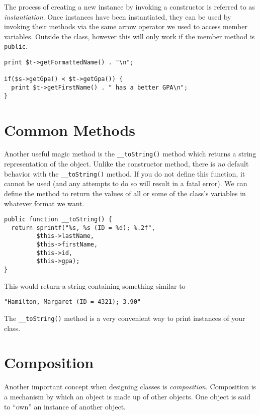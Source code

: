 The process of creating a new instance by invoking a constructor is
referred to as \emph{instantiation}.  Once instances have been instantiated,
they can be used by invoking their methods via the same arrow
operator we used to access member variables.  Outside the class, however
this will only work if the member method is \texttt{public}.

\begin{verbatim}
print $t->getFormattedName() . "\n";

if($s->getGpa() < $t->getGpa()) {
  print $t->getFirstName() . " has a better GPA\n";
}
\end{verbatim}

\section{Common Methods}


Another useful magic method is the \texttt{__toString()} 
method which returns a string representation of the object.  Unlike
the constructor method, there is \emph{no} default behavior with the
\texttt{__toString()} method.  If you do not define this
function, it cannot be used (and any attempts to do so will result
in a fatal error).  We can define the method to return the values of 
all or some of the class's variables in whatever format we want.

\begin{verbatim}
public function __toString() {
  return sprintf("%s, %s (ID = %d); %.2f", 
         $this->lastName,
         $this->firstName,
         $this->id,
         $this->gpa);
}
\end{verbatim}

This would return a string containing something similar to 

\texttt{"Hamilton, Margaret (ID = 4321); 3.90"}

The \texttt{__toString()} method is a very convenient way to
print instances of your class.  

\section{Composition}

Another important concept when designing classes is \emph{composition}.
Composition is a mechanism by which an object is made up of other objects.
One object is said to ``own'' an instance of another object.  

